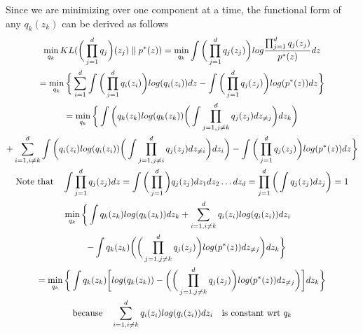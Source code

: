 \documentclass[../statistical_learning_notes.tex]{subfiles}
\begin{document}
Since we are minimizing over one component at a time, the functional form of any $q_{k}(z_{k})$ can be derived as follows
\begin{gather*}
    \min_{q_{k}} KL(\bigg(\prod_{j=1}^{d}q_{j} \bigg)(z_{j}) \parallel p^{*}(z)) = \min_{q_{k}} \int \bigg(\prod_{j=1}^{d}q_{j}(z_{j}) \bigg) log \frac{\prod_{j=1}^{d}q_{j}(z_{j})}{p^{*}(z)} dz \\
    = \min_{q_{k}} \bigg\{ \sum_{i=1}^{d} \int \bigg(\prod_{j=1}^{d} q_{i}(z_{i}) \bigg) log(q_{i}(z_{i})) dz - \int \bigg(\prod_{j=1}^{d}q_{j}(z_{j})\bigg) log(p^{*}(z)) dz \bigg\}\\
    = \min_{q_{k}} \bigg\{ \int \bigg(q_{k}(z_{k})log(q_{k}(z_{k})) \bigg( \int \prod_{j=1, j\neq k}^{d} q_{j}(z_{j}) dz_{\neq j} \bigg) dz_{k} \bigg)\\ + \sum_{i=1, i\neq k}^{d} \int \bigg( q_{i}(z_{i})log(q_{i}(z_{i})) \bigg( \int \prod_{j=1,j \neq i}^{d}q_{j}(z_{j}) dz_{\neq i} \bigg) dz_{i}\bigg) - \int \bigg(\prod_{j=1}^{d}q_{j}(z_{j})\bigg) log(p^{*}(z)) dz \bigg\}\\
    \text{Note that} \quad \int \prod_{j=1}^{d} q_{j}(z_{j}) dz = \int \bigg(\prod_{j=1}^{d} \bigg) q_{j}(z_{j}) dz_{1} dz_{2}\ldots dz_{d} = \prod_{j=1}^{d} \bigg( \int q_{j}(z_{j}) dz_{j}\bigg) = 1\\
    \min_{q_{k}} \bigg\{ \int q_{k}(z_{k})log(q_{k}(z_{k})) dz_{k} + \sum_{i=1, i\neq k}^{d} q_{i}(z_{i})log(q_{i}(z_{i})) dz_{i} \quad \\ \quad  -\int q_{k}(z_{k}) \bigg(\bigg(\prod_{j=1,j\neq k}^{d}q_{j}(z_{j})\bigg) log(p^{*}(z)) dz_{\neq j} \bigg) dz_{k} \bigg\}\\
    = \min_{q_{k}} \bigg\{ \int q_{k}(z_{k}) \bigg[ log(q_{k}(z_{k})) - \bigg(\bigg(\prod_{j=1,j\neq k}^{d}q_{j}(z_{j})\bigg) log(p^{*}(z)) dz_{\neq j} \bigg) \bigg] dz_{k} \bigg \}\\
    \text{because} \quad \sum_{i=1, i\neq k}^{d} q_{i}(z_{i})log(q_{i}(z_{i})) dz_{i} \quad \text{is constant wrt $q_{k}$}
\end{gather*}
\end{document}
